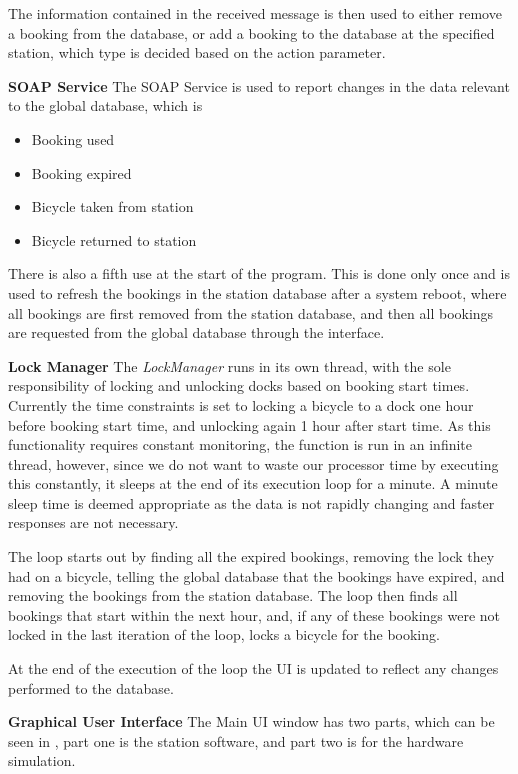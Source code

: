 The information contained in the received message is then used to either remove a booking from the database, or add a booking to the database at the specified station, which type is decided based on the action parameter.

\textbf{SOAP Service}
The SOAP Service is used to report changes in the data relevant to the global database, which is

\begin{itemize}
\item Booking used
\item Booking expired
\item Bicycle taken from station
\item Bicycle returned to station
\end{itemize}

There is also a fifth use at the start of the program.
This is done only once and is used to refresh the bookings in the station database after a system reboot, where all bookings are first removed from the station database, and then all bookings are requested from the global database through the interface.

\textbf{Lock Manager}
The \textit{LockManager} runs in its own thread, with the sole responsibility of locking and unlocking docks based on booking start times. 
Currently the time constraints is set to locking a bicycle to a dock one hour before booking start time, and unlocking again 1 hour after start time. 
As this functionality requires constant monitoring, the function is run in an infinite thread, however, since we do not want to waste our processor time by executing this constantly, it sleeps at the end of its execution loop for a minute. 
A minute sleep time is deemed appropriate as the data is not rapidly changing and faster responses are not necessary.

The loop starts out by finding all the expired bookings, removing the lock they had on a bicycle, telling the global database that the bookings have expired, and removing the bookings from the station database.
The loop then finds all bookings that start within the next hour, and, if any of these bookings were not locked in the last iteration of the loop, locks a bicycle for the booking.

At the end of the execution of the loop the UI is updated to reflect any changes performed to the database.


\textbf{Graphical User Interface}
The Main UI window has two parts, which can be seen in , part one is the station software, and part two is for the hardware simulation.

